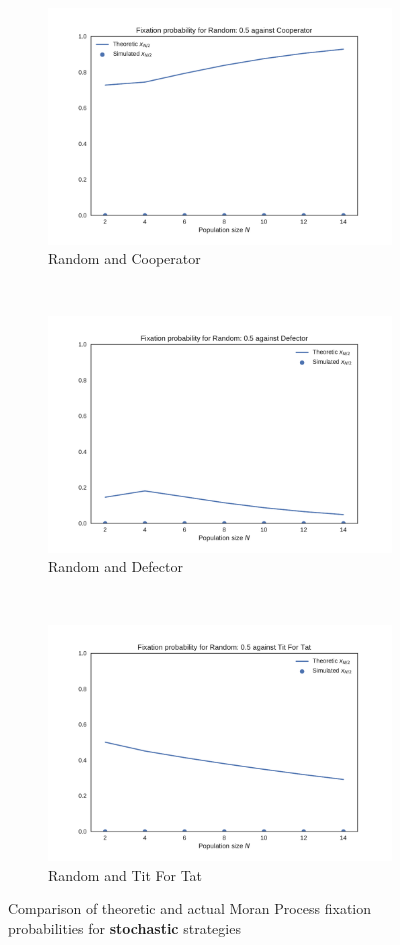 \documentclass{article}
\begin{document}
{\begin{figure}[!hbtp]
    \centering
    \begin{subfigure}[t]{.3\textwidth}
        \centering
        \includegraphics[width=.8\textwidth]{../img/Random_0_5_v_Cooperator_1000_repetitions.pdf}
        \caption{Random and Cooperator}
    \end{subfigure}%
    ~
    \begin{subfigure}[t]{.3\textwidth}
        \centering
        \includegraphics[width=.8\textwidth]{../img/Random_0_5_v_Defector_1000_repetitions.pdf}
        \caption{Random and Defector}
    \end{subfigure}%
    ~
    \begin{subfigure}[t]{.3\textwidth}
        \centering
        \includegraphics[width=.8\textwidth]{../img/Random_0_5_v_Tit_For_Tat_1000_repetitions.pdf}
        \caption{Random and Tit For Tat}
    \end{subfigure}%
    \caption{Comparison of theoretic and actual Moran Process fixation probabilities for \textbf{stochastic} strategies}
    \label{fig:comparison_stochastic}
\end{figure}

}
\end{document}

